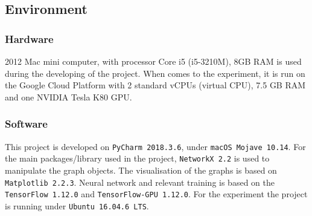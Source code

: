 \subsection{Environment}
\subsubsection*{Hardware}
2012 Mac mini computer, with processor Core i5 (i5-3210M), 8GB RAM is used during the developing of the project.
When comes to the experiment, it is run on the Google Cloud Platform with 2 standard vCPUs (virtual CPU), 7.5 GB RAM and one NVIDIA Tesla K80 GPU.
\subsubsection*{Software}
This project is developed on \texttt{PyCharm 2018.3.6}, under \texttt{macOS Mojave 10.14}.
For the main packages/library used in the project, \texttt{NetworkX 2.2} is used to manipulate the graph objects.
The visualisation of the graphs is based on \texttt{ Matplotlib 2.2.3}.
Neural network and relevant training is based on the \texttt{TensorFlow 1.12.0} and \texttt{TensorFlow-GPU 1.12.0}.
For the experiment the project is running under \texttt{Ubuntu 16.04.6 LTS}.